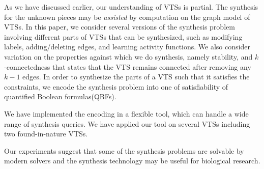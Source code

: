 %
As we have discussed earlier, our understanding of VTSs is partial.
%
%
%
%
The synthesis for the unknown pieces may be {\em assisted} by computation on
the graph model of VTSs.
%
In this paper, we consider several versions of the synthesis problem
involving different parts of VTSs that can be synthesized, such as
modifying labels, adding/deleting edges, and learning activity functions.
%
We also consider variation on the properties against which we do
synthesis, namely stability, and $k$-connectedness that states that the VTS remains connected after removing any $k-1$ edges.
%
In order to synthesize the parts of a VTS such that it satisfies the
constraints, we encode the synthesis problem into one of satisfiability of
quantified Boolean formulas(QBFs). 
%

We have implemented the encoding in a flexible tool,
which can handle a wide range of synthesis queries.
%
We have applied our tool on several VTSs including two found-in-nature
VTSs.
%
% 

Our experiments suggest that some of the synthesis problems are
solvable by modern solvers and the synthesis technology may be useful
for biological research.
%

